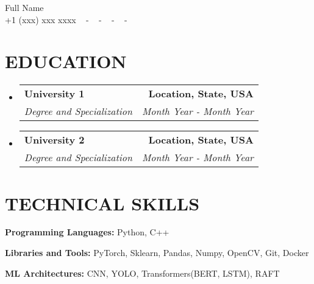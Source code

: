 \documentclass[letterpaper,11pt]{article}
\makeatletter
\newcommand{\resumeSubheading}[4]{
  \vspace{-2pt}\item
    \begin{tabular*}{1.0\textwidth}[t]{l@{\extracolsep{\fill}}r}
      \textbf{\large#1} & \textbf{\small #2} \\
      \textit{\large#3} & \textit{\small #4} \\
      
    \end{tabular*}\vspace{-7pt}
}
\newcommand{\resumeSubHeadingListStart}{\begin{itemize}[leftmargin=0.0in, label={}]}
\newcommand{\resumeSubHeadingListEnd}{\end{itemize}}
\makeatother
\begin{document}


\begin{center}
    {\huge Full Name} \\ \vspace{2pt} 
    {+1 (xxx) xxx xxxx} ~ 
    \small{-}
    \href{[url to portfolio]}{\color{blue}{Portfolio}} ~ 
    \small{-}
    \href{mailto:[enter your email id]}{\color{blue}{xxxx@gmail.com}} ~ 
    \small{-}
    \href{[url to linkedin profile]}{ \color{blue}{linkedin.com/in/username}}  ~
    \small{-}
    \href{[url to github profile]}{ \color{blue}{github.com/username}} ~
    \vspace{-7pt}
\end{center}

\section{\color{airforceblue}EDUCATION}
  \resumeSubHeadingListStart
    \resumeSubheading
      {University 1}{Location, State, USA}
      {Degree and Specialization}{Month Year - Month Year}
    \vspace{-4pt}
     \resumeSubheading
      {University 2}{Location, State, USA}
      {Degree and Specialization}{Month Year - Month Year}
  \resumeSubHeadingListEnd
  \vspace{-10pt}

\section{\color{airforceblue}TECHNICAL SKILLS}
 \begin{itemize}[leftmargin=0in, label={}]
    \small{\item{
     \textbf{\normalsize{Programming Languages:}}{ \normalsize{Python, C++}} \\
      \vspace{1.2pt}
      
     \textbf{\normalsize{Libraries and Tools:}}{ \normalsize{PyTorch,  Sklearn, Pandas, Numpy, OpenCV, Git, Docker}} \\
      \vspace{1.2pt}
      
     \textbf{\normalsize{ML Architectures:}}{ \normalsize{CNN, YOLO, Transformers(BERT, LSTM), RAFT}}

     }}
 \end{itemize}
 \vspace{-16pt}
 
\end{document}
